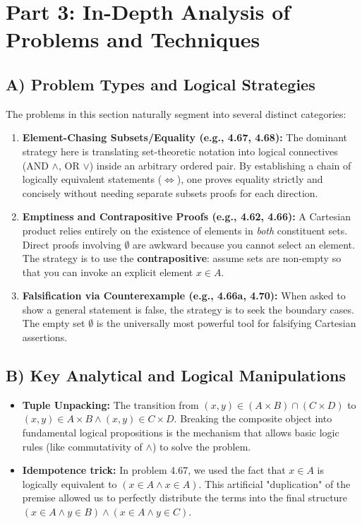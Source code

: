 \documentclass[12pt]{article}
\theoremstyle{definition}
\theoremstyle{remark}
\begin{document}
\section{Part 3: In-Depth Analysis of Problems and Techniques}

\subsection{A) Problem Types and Logical Strategies}
The problems in this section naturally segment into several distinct categories:
\begin{enumerate}
    \item \textbf{Element-Chasing Subsets/Equality (e.g., 4.67, 4.68):} The dominant strategy here is translating set-theoretic notation into logical connectives (AND $\land$, OR $\lor$) inside an arbitrary ordered pair. By establishing a chain of logically equivalent statements ($\iff$), one proves equality strictly and concisely without needing separate subsets proofs for each direction.
    \item \textbf{Emptiness and Contrapositive Proofs (e.g., 4.62, 4.66):} A Cartesian product relies entirely on the existence of elements in \textit{both} constituent sets. Direct proofs involving $\emptyset$ are awkward because you cannot select an element. The strategy is to use the \textbf{contrapositive}: assume sets are non-empty so that you can invoke an explicit element $x \in A$.
    \item \textbf{Falsification via Counterexample (e.g., 4.66a, 4.70):} When asked to show a general statement is false, the strategy is to seek the boundary cases. The empty set $\emptyset$ is the universally most powerful tool for falsifying Cartesian assertions.
\end{enumerate}

\subsection{B) Key Analytical and Logical Manipulations}
\begin{itemize}
    \item \textbf{Tuple Unpacking:} The transition from $(x, y) \in (A \times B) \cap (C \times D)$ to $(x, y) \in A \times B \land (x, y) \in C \times D$. Breaking the composite object into fundamental logical propositions is the mechanism that allows basic logic rules (like commutativity of $\land$) to solve the problem.
    \item \textbf{Idempotence trick:} In problem 4.67, we used the fact that $x \in A$ is logically equivalent to $(x \in A \land x \in A)$. This artificial "duplication" of the premise allowed us to perfectly distribute the terms into the final structure $(x \in A \land y \in B) \land (x \in A \land y \in C)$.
\end{itemize}
\end{document}
